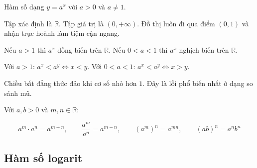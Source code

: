 \documentclass[11pt, a4paper]{article}
\begin{document}
\begin{dinhnghia}[{2 — Hàm số mũ}]
Hàm số dạng $y = a^x$ với $a > 0$ và $a \neq 1$.
\end{dinhnghia}
\begin{dinhly}
Tập xác định là $\mathbb{R}$. Tập giá trị là $(0, +\infty)$. Đồ thị luôn đi qua điểm $(0, 1)$ và nhận trục hoành làm tiệm cận ngang.
\end{dinhly}
\begin{dinhly}
Nếu $a > 1$ thì $a^x$ đồng biến trên $\mathbb{R}$. Nếu $0 < a < 1$ thì $a^x$ nghịch biến trên $\mathbb{R}$.
\end{dinhly}
\begin{dinhly}
Với $a > 1$: $a^x < a^y \iff x < y$. Với $0 < a < 1$: $a^x < a^y \iff x > y$.

 Chiều bất đẳng thức đảo khi cơ số nhỏ hơn $1$. Đây là lỗi phổ biến nhất ở dạng so sánh mũ.
\end{dinhly}
\begin{dinhly}
Với $a, b > 0$ và $m, n \in \mathbb{R}$:

$$a^m \cdot a^n = a^{m+n}, \qquad \frac{a^m}{a^n} = a^{m-n}, \qquad (a^m)^n = a^{mn}, \qquad (ab)^n = a^n b^n$$
\end{dinhly}
\subsection{Hàm số logarit}
\end{document}
